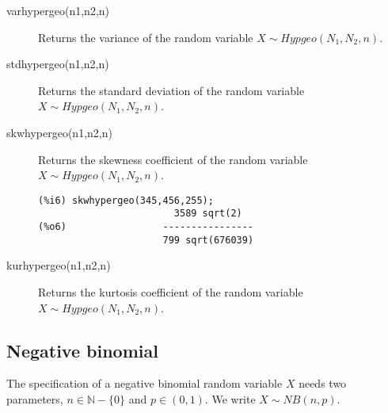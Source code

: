 \documentclass[12pt,a4paper]{article}
\newcommand{\N}{\mathbb{N}}
\begin{document}
\begin{description}
\item[varhypergeo(n1,n2,n)] Returns the variance of the random variable  $X \sim Hypgeo(N_1, N_2, n)$.

\item[stdhypergeo(n1,n2,n)] Returns the standard deviation of the random variable  $X \sim Hypgeo(N_1, N_2, n)$.

\item[skwhypergeo(n1,n2,n)] Returns the skewness coefficient of the random variable  $X \sim Hypgeo(N_1, N_2, n)$.

\begin{verbatim}
(%i6) skwhypergeo(345,456,255);
                        3589 sqrt(2)
(%o6)                 ----------------
                      799 sqrt(676039)
\end{verbatim}

\item[kurhypergeo(n1,n2,n)] Returns the kurtosis coefficient of the random variable $X \sim Hypgeo(N_1, N_2, n)$.

\end{description}

\subsection{Negative binomial}

The specification of a negative binomial random variable $X$ needs two parameters, $n \in \N-\{0\}$ and $p \in (0,1)$. We write $X \sim NB(n,p)$.
\end{document}
